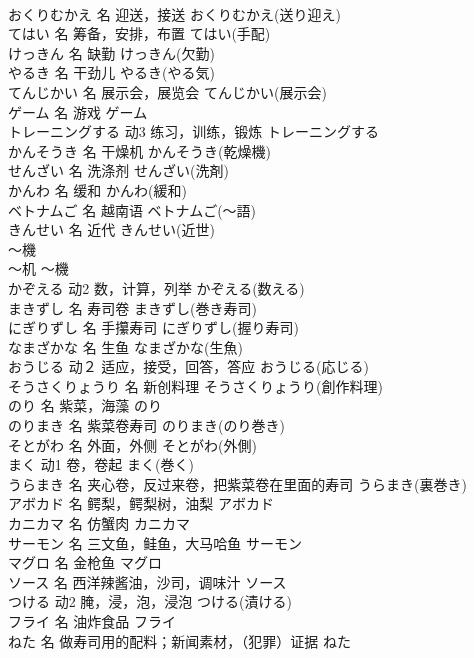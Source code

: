 \documentclass[8pt]{extreport}
\begin{document}
\begin{CJK}{UTF8}{min}
\\	おくりむかえ	名	迎送，接送	おくりむかえ(送り迎え)	
\\	てはい	名	筹备，安排，布置	てはい(手配)	
\\	けっきん	名	缺勤	けっきん(欠勤)	
\\	やるき	名	干劲儿	やるき(やる気)	
\\	てんじかい	名	展示会，展览会	てんじかい(展示会)	
\\	ゲーム	名	游戏	ゲーム	
\\	トレーニングする	动3	练习，训练，锻炼	トレーニングする	
\\	かんそうき	名	干燥机	かんそうき(乾燥機)	
\\	せんざい	名	洗涤剂	せんざい(洗剤)	
\\	かんわ	名	缓和	かんわ(緩和)	
\\	ベトナムご	名	越南语	ベトナムご(～語)	
\\	きんせい	名	近代	きんせい(近世)	
\\	～機	
\\	～机	～機	
\\	かぞえる	动2	数，计算，列举	かぞえる(数える)	
\\	まきずし	名	寿司卷	まきずし(巻き寿司)	
\\	にぎりずし	名	手攥寿司	にぎりずし(握り寿司)	
\\	なまざかな	名	生鱼	なまざかな(生魚)	
\\	おうじる	动２	适应，接受，回答，答应	おうじる(応じる)	
\\	そうさくりょうり	名	新创料理	そうさくりょうり(創作料理)	
\\	のり	名	紫菜，海藻	のり	
\\	のりまき	名	紫菜卷寿司	のりまき(のり巻き)	
\\	そとがわ	名	外面，外侧	そとがわ(外側)	
\\	まく	动1	卷，卷起	まく(巻く)	
\\	うらまき	名	夹心卷，反过来卷，把紫菜卷在里面的寿司	うらまき(裏巻き)	
\\	アボカド	名	鳄梨，鳄梨树，油梨	アボカド	
\\	カニカマ	名	仿蟹肉	カニカマ	
\\	サーモン	名	三文鱼，鲑鱼，大马哈鱼	サーモン	
\\	マグロ	名	金枪鱼	マグロ	
\\	ソース	名	西洋辣酱油，沙司，调味汁	ソース	
\\	つける	动2	腌，浸，泡，浸泡	つける(漬ける)	
\\	フライ	名	油炸食品	フライ	
\\	ねた	名	做寿司用的配料；新闻素材，（犯罪）证据	ねた	

\end{CJK}
\end{document}

